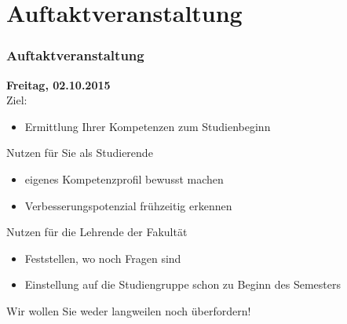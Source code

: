 \documentclass{beamer}
\begin{document}
    \section{Auftaktveranstaltung}
    
    \begin{frame} 
    	\frametitle{Auftaktveranstaltung}
    	\textbf{Freitag, 02.10.2015}\\
    	Ziel:
    	\begin{itemize}
    		\item Ermittlung Ihrer Kompetenzen zum Studienbeginn
    	\end{itemize}
    	\bigskip
    	Nutzen für Sie als Studierende
    	\begin{itemize}
    		\item eigenes Kompetenzprofil bewusst machen
    		\item Verbesserungspotenzial frühzeitig erkennen
        \end{itemize}
        \bigskip
        Nutzen für die Lehrende der Fakultät
        \begin{itemize}
        	\item Feststellen, wo noch Fragen sind
        	\item Einstellung auf die Studiengruppe schon zu Beginn des Semesters
        \end{itemize}
        Wir wollen Sie weder langweilen noch überfordern!
    \end{frame}
    
\end{document}
